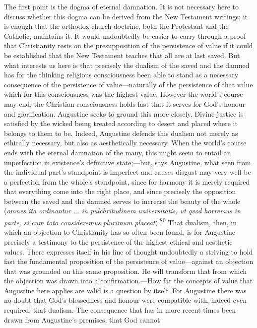 \documentclass[12pt,a4paper]{book}
\newcommand{\opage}[1]{\marginnote{\footnotesize\textit{[#1]}}}
\begin{document}
The first point is the dogma of eternal damnation. It is not necessary here to discuss whether this
dogma can be derived from the New Testament writings; it is enough that the orthodox church
doctrine, both the Protestant and the Catholic, maintains it. It would undoubtedly be easier to
carry through a proof that Christianity rests on the presupposition of the persistence of value if
it could be established that the New Testament teaches that all are at last saved. But what
interests us here is that precisely the dualism of the saved and the damned has for the thinking
religious consciousness been able to stand as a necessary consequence of the persistence of
value---naturally of the persistence of that value which for this consciousness was the highest
value. However the world's course may end, the Christian consciousness holds fast that it serves
for God's honour and glorification. Augustine seeks to ground this more closely. Divine justice is
satisfied by the wicked being treated according to desert and placed where it 
\opage{161}belongs to them to be.
Indeed, Augustine defends this dualism not merely as ethically necessary, but also as aesthetically
necessary. When the world's course ends with the eternal damnation of the many, this might seem to
entail an imperfection in existence's definitive state;---but, says Augustine, what seen from the
individual part's standpoint is imperfect and causes disgust may very well be a perfection from the
whole's standpoint, since for harmony it is merely required that everything come into the right
place, and since precisely the opposition between the saved and the damned serves to increase the
beauty of the whole (\textit{omnes ita ordinantur \ldots\ in pulchritudinem universitatis, ut qvod
horremus in parte, si cum toto consideremus plurimum placeat}).\textsuperscript{80} That dualism,
then, in which an objection to Christianity has so often been found, is for Augustine precisely a
testimony to the persistence of the highest ethical and aesthetic values. There expresses itself in
his line of thought undoubtedly a striving to hold fast the fundamental proposition of the
persistence of value---against an objection that was grounded on this same proposition. He will
transform that from which the objection was drawn into a confirmation.---How far the concepts of
value that Augustine here applies are valid is a question by itself. For Augustine there was no
doubt that God's blessedness and honour were compatible with, indeed even required, that dualism.
The consequence that has in more recent times been drawn from Augustine's premises, that God cannot
\end{document}
